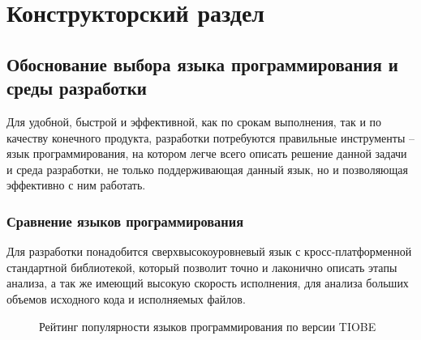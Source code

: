 \chapter{Конструкторский раздел}\label{ch:ch2}
\section{Обоснование выбора языка программирования и среды разработки}\label{sec:ch2/sec1}
Для удобной, быстрой и эффективной, как по срокам выполнения, так и по качеству конечного продукта,
разработки {\ProgModule} потребуются правильные инструменты -- язык программирования, на котором 
легче всего описать решение данной задачи и среда разработки, не только поддерживающая данный язык,
но и позволяющая эффективно с ним работать.

\subsection{Сравнение языков программирования}\label{sec:ch2/sec1/sub1}
Для разработки {\ProgModule} понадобится сверхвысокоуровневый язык с кросс-платформенной
стандартной библиотекой, который позволит точно и лаконично описать этапы анализа,
а так же имеющий высокую скорость исполнения, для анализа больших объемов исходного кода и
исполняемых файлов.
\begin{figure}[!htbp]
    \caption{Рейтинг популярности языков программирования по версии TIOBE\label{fig:lang-ratings}}
\end{figure}

